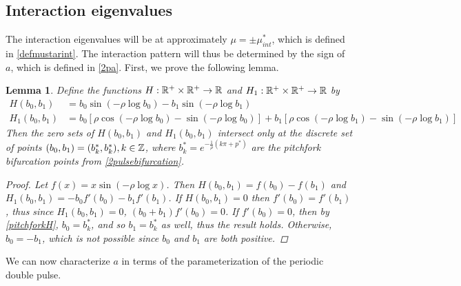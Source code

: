 \documentclass[10pt,reqno]{amsart}
\theoremstyle{plain}
\newtheorem{lemma}[theorem]{Lemma}
\theoremstyle{definition}
\theoremstyle{remark}
\numberwithin{theorem}{section}
\numberwithin{equation}{section}
\begin{document}
\subsection{Interaction eigenvalues}\label{sec:2pinteigs}

The interaction eigenvalues will be at approximately $\mu = \pm \mu_{int}^*$, which is defined in \cref{defmustarint}. The interaction pattern will thus be determined by the sign of $a$, which is defined in \cref{2pa}. First, we prove the following lemma.

\begin{lemma}\label{lemma:Hoverlaplemma}
Define the functions $H: \mathbb{R}^+ \times \mathbb{R}^+ \rightarrow \mathbb{R}$ and $H_1: \mathbb{R}^+ \times \mathbb{R}^+ \rightarrow \mathbb{R}$ by 
\begin{align}
H(b_0, b_1) &= b_0 \sin \left( -\rho \log b_0 \right) - b_1 \sin \left( -\rho \log b_1 \right) \label{perdefH} \\
H_1(b_0, b_1) &= b_0 \left[ \rho \cos \left( -\rho \log b_0 \right) - \sin \left( -\rho \log b_0 \right) \right] + b_1 \left[ \rho \cos \left( -\rho \log b_1 \right) - \sin \left( -\rho \log b_1 \right) \right] \label{perdefH1}
\end{align}
Then the zero sets of $H(b_0, b_1)$ and $H_1(b_0, b_1)$ intersect only at the discrete set of points $(b_0, b_1) = (b_k^*, b_k^*), k \in \mathbb{Z}$, where $b^*_k = e^{-\frac{1}{\rho} (k \pi + p^*) }$ are the pitchfork bifurcation points from \cref{2pulsebifurcation}.
\begin{proof}
Let $f(x) = x \sin \left( -\rho \log x \right)$. Then $H(b_0, b_1) = f(b_0) - f(b_1)$ and $H_1(b_0, b_1) = -b_0 f'(b_0) - b_1 f'(b_1)$. If $H(b_0, b_1) = 0$ then $f'(b_0) = f'(b_1)$, thus since $H_1(b_0, b_1) = 0$, $(b_0 + b_1) f'(b_0) = 0$. If $f'(b_0) = 0$, then by \cref{pitchforkH}, $b_0 = b_k^*$, and so $b_1 = b_k^*$ as well, thus the result holds. Otherwise, $b_0 = -b_1$, which is not possible since $b_0$ and $b_1$ are both positive.
\end{proof}
\end{lemma}

We can now characterize $a$ in terms of the parameterization of the periodic double pulse. 
\end{document}
